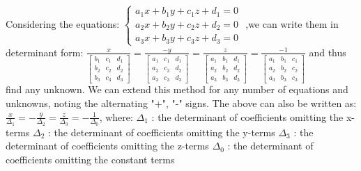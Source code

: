 \documentclass[12pt]{article}
\begin{document}
\begin{flushleft}
	\textbullet \quad Considering the equations: \linebreak 
	$\displaystyle \begin{cases}
	a_1 x+b_1 y+c_1 z+d_1 =0 \\ 
	a_2 x+b_2 y+c_2 z+d_2 =0 \\
	a_3 x+b_3 y+c_3 z+d_3 =0
	\end{cases} $
	,we can write them in determinant form: \linebreak 
	$\displaystyle \frac{x}{
	\begin{bmatrix}
	b_1 & c_1 & d_1 \\ 
	b_2 & c_2 & d_2 \\ 
	b_3 & c_3 & d_3
	\end{bmatrix}} 
	= \frac{-y}{
	\begin{bmatrix}
	a_1 & c_1 & d_1 \\ 
	a_2 & c_2 & d_2 \\ 
	a_3 & c_3 & d_3
	\end{bmatrix}}
	= \frac{z}{
	\begin{bmatrix}
	a_1 & b_1 & d_1 \\ 
	a_2 & b_2 & d_2 \\
	a_3 & b_3 & d_3
	\end{bmatrix}}
	= \frac{-1}{
	\begin{bmatrix}
	a_1 & b_1 & c_1 \\ 
	a_2 & b_2 & c_2 \\ 
	a_3 & b_3 & c_3
	\end{bmatrix}} 	$ \linebreak 
	and thus find any unknown. We can extend this method for any number of equations and unknowns, noting the alternating "+", "-" signs. The above can also be written as: \linebreak 
	$\displaystyle  \frac{x}{\Delta_1} = -\frac{y}{\Delta_2} = \frac{z}{\Delta_3} = -\frac{1}{\Delta_0} $, \linebreak 
	where: \linebreak 
	$\Delta_1$  :  the determinant of coefficients omitting the x-terms \linebreak 
	$\Delta_2$  :  the determinant of coefficients omitting the y-terms \linebreak 
	$\Delta_3$  :  the determinant of coefficients omitting the z-terms \linebreak 
	$\Delta_0$  :  the determinant of coefficients omitting the constant terms \linebreak 
	

\end{flushleft}
\end{document}
